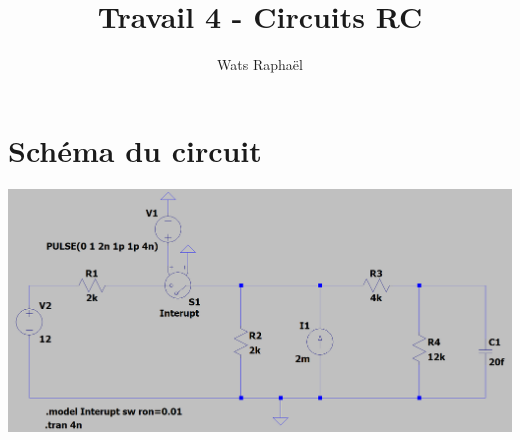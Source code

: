 \documentclass{homeworg}
\title{Travail 4 - Circuits RC}
\author{Wats Raphaël}
\begin{document}
\maketitle

\section{Schéma du circuit}
    \begin{center}
        \includegraphics[scale=0.35]{Shematic.png}
    \end{center}

\newpage
\end{document}
